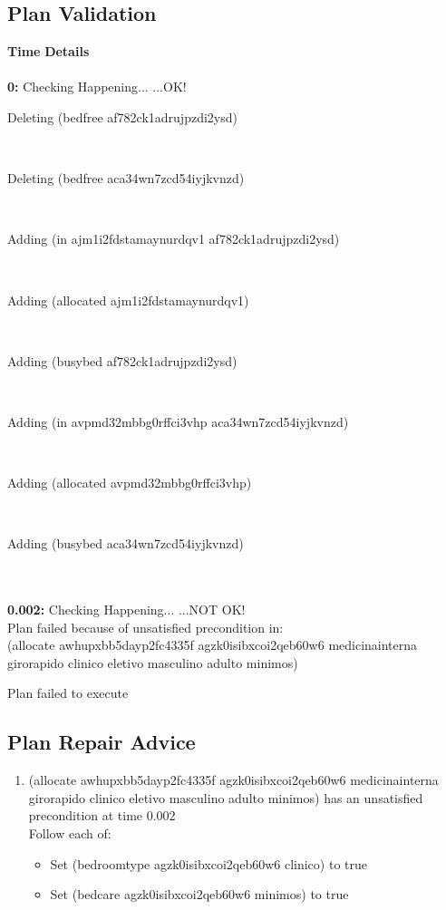 \documentclass[a4paper,12pt]{article}
\newcommand{\headingtimedetails}{{\bf Time} \qquad \= {\bf Details}\\[0.8ex]}
\newcommand{\atime}[1]{{\bf #1:}}
\newcommand{\action}[1]{{\sf #1}}
\newcommand{\exprn}[1]{{\sf #1}}
\newcommand{\checkhappening}{Checking Happening... }
\newcommand{\listrow}[1]{\begin{minipage}[t]{11.5cm} #1 \end{minipage}}
\newcommand{\happeningOK}{...OK!}
\newcommand{\notOK}{...NOT OK!}
\newcommand{\adding}[1]{\listrow{Adding \exprn{#1} }}
\newcommand{\deleting}[1]{\listrow{Deleting \exprn{#1} }}
\begin{document}
\subsection{Plan Validation}
\begin{tabbing}
\headingtimedetails 
\\
\atime{0} \> \checkhappening\happeningOK\\
 \> \deleting{(bedfree af782ck1adrujpzdi2ysd)}\\
 \> \deleting{(bedfree aca34wn7zcd54iyjkvnzd)}\\
 \> \adding{(in ajm1i2fdstamaynurdqv1 af782ck1adrujpzdi2ysd)}\\
 \> \adding{(allocated ajm1i2fdstamaynurdqv1)}\\
 \> \adding{(busybed af782ck1adrujpzdi2ysd)}\\
 \> \adding{(in avpmd32mbbg0rffci3vhp aca34wn7zcd54iyjkvnzd)}\\
 \> \adding{(allocated avpmd32mbbg0rffci3vhp)}\\
 \> \adding{(busybed aca34wn7zcd54iyjkvnzd)}\\
\\
\atime{0.002} \> \checkhappening \notOK \\
 \> Plan failed because of unsatisfied precondition in:\\
 \> \action{(allocate awhupxbb5dayp2fc4335f agzk0isibxcoi2qeb60w6 medicinainterna girorapido clinico eletivo masculino adulto minimos)}\\
\end{tabbing}

Plan failed to execute
\subsection{Plan Repair Advice}
\begin{enumerate}
\item \action{(allocate awhupxbb5dayp2fc4335f agzk0isibxcoi2qeb60w6 medicinainterna girorapido clinico eletivo masculino adulto minimos)} has an unsatisfied precondition at time 0.002\\
Follow each of:
\begin{itemize}\item Set \exprn{(bedroomtype agzk0isibxcoi2qeb60w6 clinico)} to true
\item Set \exprn{(bedcare agzk0isibxcoi2qeb60w6 minimos)} to true
\end{itemize}\end{enumerate}
\end{document}
